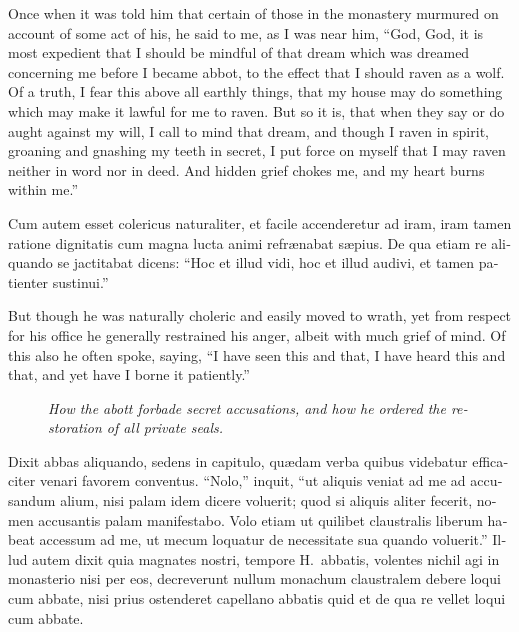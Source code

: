 \documentclass[10pt]{book}
\newcommand{\blockhead}[4][]{
\begin{figure}
\centering
\vspace{#4}
\parbox{2.75cm}{\begin{center}\footnotesize \color{BrickRed} \emph{#2}\\ #1 \end{center}}
\end{figure}
}
\begin{document}
\begin{paracol}{2}
\begin{otherlanguage}{latin}
\end{otherlanguage}

\switchcolumn

Once when it was told him that certain of those in the monastery murmured on account of some act of his, he said to me, as I was near him, ``God, God, it is most expedient that I should be mindful of that dream which was dreamed concerning me before I became abbot, to the effect that I should raven as a wolf. Of a truth, I fear this above all earthly things, that my house may do something which may make it lawful for me to raven. But so it is, that when they say or do aught against my will, I call to mind that dream, and though I raven in spirit, groaning and gnashing my teeth in secret, I put force on myself that I may raven neither in word nor in deed. And hidden grief chokes me, and my heart burns within me.''

\switchcolumn*

\begin{otherlanguage}{latin}
Cum autem esset colericus naturaliter, et facile accenderetur ad iram, iram tamen ratione dignitatis cum magna lucta animi refr\ae{}nabat s\ae{}pius. De qua etiam re aliquando se jactitabat dicens: ``Hoc et illud vidi, hoc et illud audivi, et tamen patienter sustinui.''
\end{otherlanguage}

\switchcolumn

But though he was naturally choleric and easily moved to wrath, yet from respect for his office he generally restrained his anger, albeit with much grief of mind. Of this also he often spoke, saying, ``I have seen this and that, I have heard this and that, and yet have I borne it patiently.''

\switchcolumn*

\begin{otherlanguage}{latin}
\blockhead{How the abott forbade secret accusations, and how he ordered the restoration of all private seals.}{4}{-0.65cm}
Dixit abbas aliquando, sedens in capitulo, qu\ae{}dam verba quibus videbatur efficaciter venari favorem conventus. ``Nolo,'' inquit, ``ut aliquis veniat ad me ad accusandum alium, nisi palam idem dicere voluerit; quod si aliquis aliter fecerit, nomen accusantis palam manifestabo. Volo etiam ut quilibet claustralis liberum habeat accessum ad me, ut mecum loquatur de necessitate sua quando voluerit.'' Illud autem dixit quia magnates nostri, tempore H.\ abbatis, volentes nichil agi in monasterio nisi per eos, decreverunt nullum monachum claustralem debere loqui cum abbate, nisi prius ostenderet capellano abbatis quid et de qua re vellet loqui cum abbate.


\end{otherlanguage}
\end{paracol}
\end{document}
